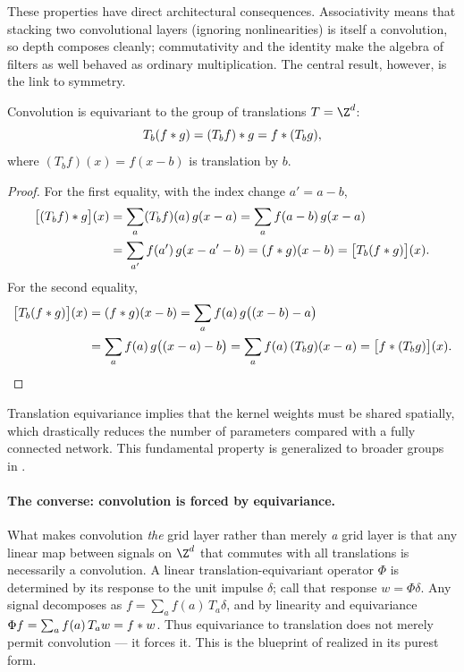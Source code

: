 These properties have direct architectural consequences. Associativity means
that stacking two convolutional layers (ignoring nonlinearities) is itself a
convolution, so depth composes cleanly; commutativity and the identity make the
algebra of filters as well behaved as ordinary multiplication. The central
result, however, is the link to symmetry.

\begin{theorem}
\label{thm:grids:equivariance}
Convolution is equivariant to the group of translations $T = \Z^d$:
\[
  T_b(f * g) = (T_b f) * g = f * (T_b g),
\]
where $(T_b f)(x) = f(x-b)$ is translation by $b$.
\end{theorem}

\begin{proof}
For the first equality, with the index change $a' = a - b$,
\begin{align}
\big[(T_b f) * g\big](x)
  &= \sum_a (T_b f)(a)\, g(x - a) = \sum_a f(a - b)\, g(x - a) \nonumber \\
  &= \sum_{a'} f(a')\, g(x - a' - b) = (f * g)(x - b)
   = \big[T_b(f * g)\big](x).
\end{align}
For the second equality,
\begin{align}
\big[T_b(f * g)\big](x)
  &= (f * g)(x - b) = \sum_a f(a)\, g\big((x - b) - a\big) \nonumber \\
  &= \sum_a f(a)\, g\big((x - a) - b\big) = \sum_a f(a)\,(T_b g)(x - a)
   = \big[f * (T_b g)\big](x).
\end{align}
\end{proof}

Translation equivariance implies that the kernel weights must be shared
spatially, which drastically reduces the number of parameters compared with a
fully connected network. This fundamental property is generalized to broader
groups in .

\paragraph{The converse: convolution is forced by equivariance.}
What makes convolution \emph{the} grid layer rather than merely \emph{a} grid
layer is that any linear map between signals on $\Z^d$ that commutes with all
translations is necessarily a convolution. A linear translation-equivariant
operator $\Phi$ is determined by its response to the unit impulse $\delta$; call
that response $w = \Phi\delta$. Any signal decomposes as
$f = \sum_a f(a)\, T_a \delta$, and by linearity and equivariance
$\Phi f = \sum_a f(a)\, T_a w = f * w$. Thus equivariance to translation does
not merely permit convolution --- it forces it. This is the blueprint of
 realized in its purest form.

